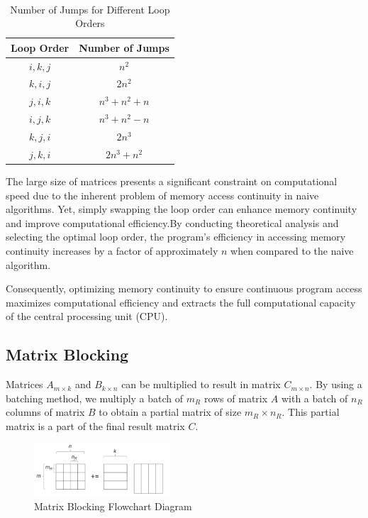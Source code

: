 \documentclass[conference]{IEEEtran}
\begin{document}
	\begin{table}[htbp]
		\caption{Number of Jumps for Different Loop Orders}
		\centering\
		\setlength\extrarowheight{2pt}
		\label{tab:loopjumps}
		\begin{tabular}{|c|c|}
			\hline
			Loop Order & Number of Jumps \\ \hline
			$i,k,j$ & $n^2$ \\ \hline
			$k,i,j$ & $2n^2$ \\ \hline
			$j,i,k$ & $n^3 + n^2 + n$ \\ \hline
			$i,j,k$ & $n^3 + n^2 - n$ \\ \hline
			$k,j,i$ & $2n^3$ \\ \hline
			$j,k,i$ & $2n^3 + n^2$ \\ \hline
		\end{tabular}
	\end{table}
	
	The large size of matrices presents a significant constraint on computational speed due to the inherent problem of memory access continuity in naive algorithms. Yet, simply swapping the loop order can enhance memory continuity and improve computational efficiency.By conducting theoretical analysis and selecting the optimal loop order, the program's efficiency in accessing memory continuity increases by a factor of approximately $n$ when compared to the naive algorithm.
	
	Consequently, optimizing memory continuity to ensure continuous program access maximizes computational efficiency and extracts the full computational capacity of the central processing unit (CPU).
	\subsection{Matrix Blocking}
	Matrices $A_{m \times k}$ and $B_{k \times n}$ can be multiplied to result in matrix $C_{m \times n}$. By using a batching method, we multiply a batch of $m_R$ rows of matrix $A$ with a batch of $n_R$ columns of matrix $B$ to obtain a partial matrix of size $m_R \times n_R$. This partial matrix is a part of the final result matrix $C$.
	
	\begin{figure}[htbp]
		\centerline{\includegraphics[width=0.45\textwidth]{fig1.png}}
		\caption{Matrix Blocking Flowchart Diagram}
		\label{matrixBlockingOverall}
	\end{figure}
	
\end{document}
